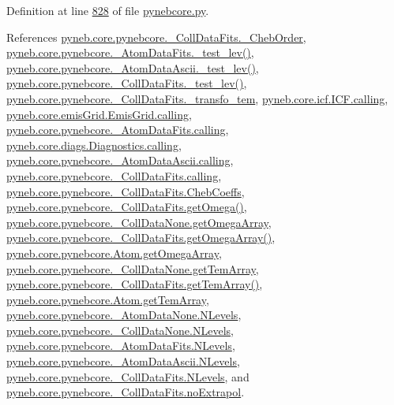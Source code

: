 Definition at line \hyperlink{pynebcore_8py_source_l00828}{828} of file \hyperlink{pynebcore_8py_source}{pynebcore.\-py}.



References \hyperlink{pynebcore_8py_source_l00673}{pyneb.\-core.\-pynebcore.\-\_\-\-Coll\-Data\-Fits.\-\_\-\-Cheb\-Order}, \hyperlink{pynebcore_8py_source_l00178}{pyneb.\-core.\-pynebcore.\-\_\-\-Atom\-Data\-Fits.\-\_\-test\-\_\-lev()}, \hyperlink{pynebcore_8py_source_l00447}{pyneb.\-core.\-pynebcore.\-\_\-\-Atom\-Data\-Ascii.\-\_\-test\-\_\-lev()}, \hyperlink{pynebcore_8py_source_l00677}{pyneb.\-core.\-pynebcore.\-\_\-\-Coll\-Data\-Fits.\-\_\-test\-\_\-lev()}, \hyperlink{pynebcore_8py_source_l00606}{pyneb.\-core.\-pynebcore.\-\_\-\-Coll\-Data\-Fits.\-\_\-transfo\-\_\-tem}, \hyperlink{icf_8py_source_l00016}{pyneb.\-core.\-icf.\-I\-C\-F.\-calling}, \hyperlink{emis_grid_8py_source_l00044}{pyneb.\-core.\-emis\-Grid.\-Emis\-Grid.\-calling}, \hyperlink{pynebcore_8py_source_l00097}{pyneb.\-core.\-pynebcore.\-\_\-\-Atom\-Data\-Fits.\-calling}, \hyperlink{diags_8py_source_l00169}{pyneb.\-core.\-diags.\-Diagnostics.\-calling}, \hyperlink{pynebcore_8py_source_l00318}{pyneb.\-core.\-pynebcore.\-\_\-\-Atom\-Data\-Ascii.\-calling}, \hyperlink{pynebcore_8py_source_l00585}{pyneb.\-core.\-pynebcore.\-\_\-\-Coll\-Data\-Fits.\-calling}, \hyperlink{pynebcore_8py_source_l00674}{pyneb.\-core.\-pynebcore.\-\_\-\-Coll\-Data\-Fits.\-Cheb\-Coeffs}, \hyperlink{pynebcore_8py_source_l00828}{pyneb.\-core.\-pynebcore.\-\_\-\-Coll\-Data\-Fits.\-get\-Omega()}, \hyperlink{pynebcore_8py_source_l00074}{pyneb.\-core.\-pynebcore.\-\_\-\-Coll\-Data\-None.\-get\-Omega\-Array}, \hyperlink{pynebcore_8py_source_l00800}{pyneb.\-core.\-pynebcore.\-\_\-\-Coll\-Data\-Fits.\-get\-Omega\-Array()}, \hyperlink{pynebcore_8py_source_l01283}{pyneb.\-core.\-pynebcore.\-Atom.\-get\-Omega\-Array}, \hyperlink{pynebcore_8py_source_l00075}{pyneb.\-core.\-pynebcore.\-\_\-\-Coll\-Data\-None.\-get\-Tem\-Array}, \hyperlink{pynebcore_8py_source_l00897}{pyneb.\-core.\-pynebcore.\-\_\-\-Coll\-Data\-Fits.\-get\-Tem\-Array()}, \hyperlink{pynebcore_8py_source_l01284}{pyneb.\-core.\-pynebcore.\-Atom.\-get\-Tem\-Array}, \hyperlink{pynebcore_8py_source_l00069}{pyneb.\-core.\-pynebcore.\-\_\-\-Atom\-Data\-None.\-N\-Levels}, \hyperlink{pynebcore_8py_source_l00082}{pyneb.\-core.\-pynebcore.\-\_\-\-Coll\-Data\-None.\-N\-Levels}, \hyperlink{pynebcore_8py_source_l00098}{pyneb.\-core.\-pynebcore.\-\_\-\-Atom\-Data\-Fits.\-N\-Levels}, \hyperlink{pynebcore_8py_source_l00319}{pyneb.\-core.\-pynebcore.\-\_\-\-Atom\-Data\-Ascii.\-N\-Levels}, \hyperlink{pynebcore_8py_source_l00586}{pyneb.\-core.\-pynebcore.\-\_\-\-Coll\-Data\-Fits.\-N\-Levels}, and \hyperlink{pynebcore_8py_source_l00584}{pyneb.\-core.\-pynebcore.\-\_\-\-Coll\-Data\-Fits.\-no\-Extrapol}.




